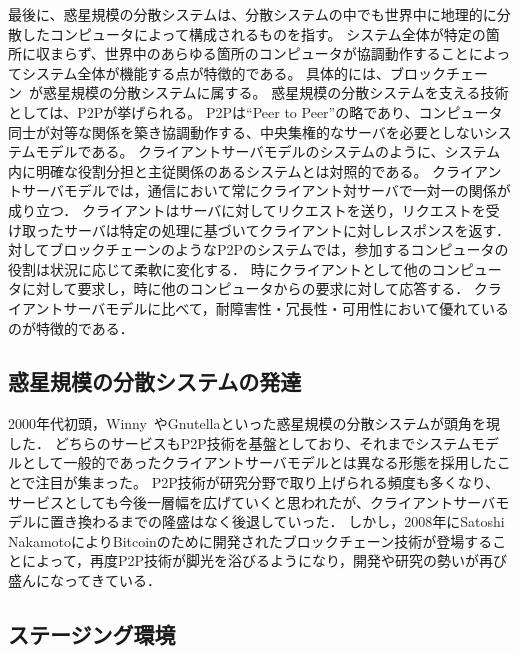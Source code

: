 最後に、惑星規模の分散システムは、分散システムの中でも世界中に地理的に分散したコンピュータによって構成されるものを指す。
システム全体が特定の箇所に収まらず、世界中のあらゆる箇所のコンピュータが協調動作することによってシステム全体が機能する点が特徴的である。
具体的には、ブロックチェーン~\cite{Bitcoin}が惑星規模の分散システムに属する。
惑星規模の分散システムを支える技術としては、P2Pが挙げられる。
P2Pは``Peer to Peer''の略であり、コンピュータ同士が対等な関係を築き協調動作する、中央集権的なサーバを必要としないシステムモデルである。
クライアントサーバモデルのシステムのように、システム内に明確な役割分担と主従関係のあるシステムとは対照的である。
クライアントサーバモデルでは，通信において常にクライアント対サーバで一対一の関係が成り立つ．
クライアントはサーバに対してリクエストを送り，リクエストを受け取ったサーバは特定の処理に基づいてクライアントに対しレスポンスを返す．
対してブロックチェーンのようなP2Pのシステムでは，参加するコンピュータの役割は状況に応じて柔軟に変化する．
時にクライアントとして他のコンピュータに対して要求し，時に他のコンピュータからの要求に対して応答する．
クライアントサーバモデルに比べて，耐障害性・冗長性・可用性において優れているのが特徴的である．

\subsection{惑星規模の分散システムの発達}

2000年代初頭，Winny~\cite{Winny}やGnutellaといった惑星規模の分散システムが頭角を現した．
どちらのサービスもP2P技術を基盤としており、それまでシステムモデルとして一般的であったクライアントサーバモデルとは異なる形態を採用したことで注目が集まった。
P2P技術が研究分野で取り上げられる頻度も多くなり、サービスとしても今後一層幅を広げていくと思われたが、クライアントサーバモデルに置き換わるまでの隆盛はなく後退していった．
しかし，2008年にSatoshi NakamotoによりBitcoinのために開発されたブロックチェーン技術が登場することによって，再度P2P技術が脚光を浴びるようになり，開発や研究の勢いが再び盛んになってきている．

\subsection{ステージング環境}

